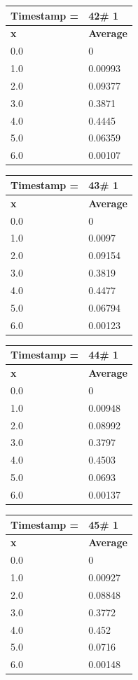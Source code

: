\begin{tabular}{|l||l|}
\hline
\textbf{Timestamp =} & \textbf{42}\# 1\\\hline
	\textbf{x} & \textbf{Average} \\ \hline
\hline
	0.0 & 0 \\ \hline
	1.0 & 0.00993 \\ \hline
	2.0 & 0.09377 \\ \hline
	3.0 & 0.3871 \\ \hline
	4.0 & 0.4445 \\ \hline
	5.0 & 0.06359 \\ \hline
	6.0 & 0.00107 \\ \hline
\end{tabular}
\begin{tabular}{|l||l|}
\hline
\textbf{Timestamp =} & \textbf{43}\# 1\\\hline
	\textbf{x} & \textbf{Average} \\ \hline
\hline
	0.0 & 0 \\ \hline
	1.0 & 0.0097 \\ \hline
	2.0 & 0.09154 \\ \hline
	3.0 & 0.3819 \\ \hline
	4.0 & 0.4477 \\ \hline
	5.0 & 0.06794 \\ \hline
	6.0 & 0.00123 \\ \hline
\end{tabular}

\begin{tabular}{|l||l|}
\hline
\textbf{Timestamp =} & \textbf{44}\# 1\\\hline
	\textbf{x} & \textbf{Average} \\ \hline
\hline
	0.0 & 0 \\ \hline
	1.0 & 0.00948 \\ \hline
	2.0 & 0.08992 \\ \hline
	3.0 & 0.3797 \\ \hline
	4.0 & 0.4503 \\ \hline
	5.0 & 0.0693 \\ \hline
	6.0 & 0.00137 \\ \hline
\end{tabular}
\begin{tabular}{|l||l|}
\hline
\textbf{Timestamp =} & \textbf{45}\# 1\\\hline
	\textbf{x} & \textbf{Average} \\ \hline
\hline
	0.0 & 0 \\ \hline
	1.0 & 0.00927 \\ \hline
	2.0 & 0.08848 \\ \hline
	3.0 & 0.3772 \\ \hline
	4.0 & 0.452 \\ \hline
	5.0 & 0.0716 \\ \hline
	6.0 & 0.00148 \\ \hline
\end{tabular}

